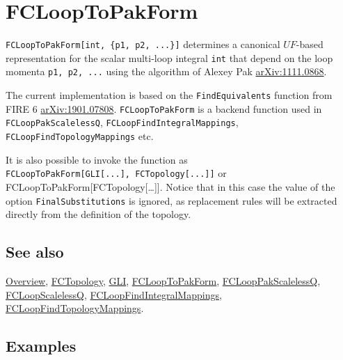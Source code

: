 \documentclass[../FeynCalcManual.tex]{subfiles}
\begin{document}
\hypertarget{fclooptopakform}{%
\section{FCLoopToPakForm}\label{fclooptopakform}}

\texttt{FCLoopToPakForm[\allowbreak{}int,\ \allowbreak{}\{\allowbreak{}p1,\ \allowbreak{}p2,\ \allowbreak{}...\}]}
determines a canonical \(UF\)-based representation for the scalar
multi-loop integral \texttt{int} that depend on the loop momenta
\texttt{p1,\ \allowbreak{}p2,\ \allowbreak{}...} using the algorithm of
Alexey Pak \href{https://arxiv.org/abs/1111.0868}{arXiv:1111.0868}.

The current implementation is based on the \texttt{FindEquivalents}
function from FIRE 6
\href{https://arxiv.org/abs/1901.07808}{arXiv:1901.07808}.
\texttt{FCLoopToPakForm} is a backend function used in
\texttt{FCLoopPakScalelessQ}, \texttt{FCLoopFindIntegralMappings},
\texttt{FCLoopFindTopologyMappings} etc.

It is also possible to invoke the function as
\texttt{FCLoopToPakForm[\allowbreak{}GLI[\allowbreak{}...],\ \allowbreak{}FCTopology[\allowbreak{}...]]}
or FCLoopToPakForm{[}FCTopology{[}\ldots{]}{]}. Notice that in this case
the value of the option \texttt{FinalSubstitutions} is ignored, as
replacement rules will be extracted directly from the definition of the
topology.

\subsection{See also}

\hyperlink{toc}{Overview}, \hyperlink{fctopology}{FCTopology},
\hyperlink{gli}{GLI}, \hyperlink{fclooptopakform}{FCLoopToPakForm},
\hyperlink{fclooppakscalelessq}{FCLoopPakScalelessQ},
\hyperlink{fcloopscalelessq}{FCLoopScalelessQ},
\hyperlink{fcloopfindintegralmappings}{FCLoopFindIntegralMappings},
\hyperlink{fcloopfindtopologymappings}{FCLoopFindTopologyMappings}.

\subsection{Examples}
\end{document}
